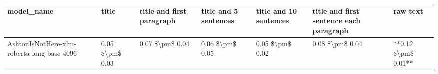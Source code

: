 \begin{tabular}{lllllll}
\toprule
                                model\_name &           title & title and first paragraph & title and 5 sentences & title and 10 sentences & title and first sentence each paragraph &            raw text \\
\midrule
AshtonIsNotHere-xlm-roberta-long-base-4096 & 0.05 \$\textbackslash pm\$ 0.03 &           0.07 \$\textbackslash pm\$ 0.04 &       0.06 \$\textbackslash pm\$ 0.05 &        0.05 \$\textbackslash pm\$ 0.02 &                         0.08 \$\textbackslash pm\$ 0.04 & **0.12 \$\textbackslash pm\$ 0.01** \\
\bottomrule
\end{tabular}
